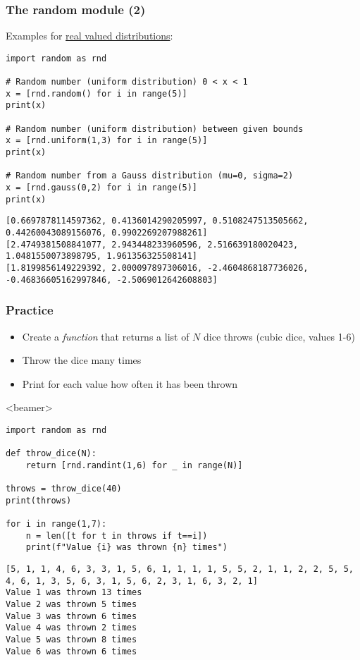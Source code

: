 \begin{frame}[fragile]
  \frametitle{The random module (2)}
  Examples for \href{https://docs.python.org/3/library/random.html#real-valued-distributions}{real valued distributions}:
  \begin{lstlisting}
import random as rnd

# Random number (uniform distribution) 0 < x < 1
x = [rnd.random() for i in range(5)]
print(x)

# Random number (uniform distribution) between given bounds
x = [rnd.uniform(1,3) for i in range(5)]
print(x)

# Random number from a Gauss distribution (mu=0, sigma=2)
x = [rnd.gauss(0,2) for i in range(5)]
print(x)
  \end{lstlisting}\pause

  \begin{lstlisting}[style=PyOutput,basicstyle=\tiny\ttfamily]
[0.6697878114597362, 0.4136014290205997, 0.5108247513505662, 0.44260043089156076, 0.9902269207988261]
[2.4749381508841077, 2.943448233960596, 2.516639180020423, 1.0481550073898795, 1.961356325508141]
[1.8199856149229392, 2.000097897306016, -2.4604868187736026, -0.46836605162997846, -2.5069012642608803]
  \end{lstlisting}
\end{frame}
  
\begin{frame}[fragile,label=practice_random]
  \frametitle{Practice}
  \begin{itemize}
    \item Create a \emph{function} that returns a list of $N$ dice throws (cubic dice, values 1-6)
    \item Throw the dice many times
    \item Print for each value how often it has been thrown
  \end{itemize} \pause
  \begin{onlyenv}<beamer>
    \begin{lstlisting}
import random as rnd

def throw_dice(N):
    return [rnd.randint(1,6) for _ in range(N)]

throws = throw_dice(40)
print(throws)

for i in range(1,7):
    n = len([t for t in throws if t==i])
    print(f"Value {i} was thrown {n} times")
        \end{lstlisting}\pause
  \end{onlyenv}
  \begin{lstlisting}[style=PyOutput,basicstyle=\tiny\ttfamily]
[5, 1, 1, 4, 6, 3, 3, 1, 5, 6, 1, 1, 1, 1, 5, 5, 2, 1, 1, 2, 2, 5, 5, 4, 6, 1, 3, 5, 6, 3, 1, 5, 6, 2, 3, 1, 6, 3, 2, 1]
Value 1 was thrown 13 times
Value 2 was thrown 5 times
Value 3 was thrown 6 times
Value 4 was thrown 2 times
Value 5 was thrown 8 times
Value 6 was thrown 6 times
  \end{lstlisting}
\end{frame}

